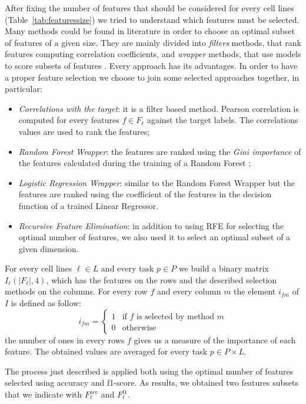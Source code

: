 After fixing the number of features that should be considered for every cell lines (Table~\ref{tab:featuressize}) we tried to understand which features must be selected. Many methods could be found in literature in order to choose an optimal subset of features of a given size. They are mainly divided into \emph{filters} methods, that rank features computing correlation coefficients, and \emph{wrapper} methods, that use models to score subsets of features \cite{Guyon}. Every approach has its advantages. In order to have a proper feature selection we choose to join some selected approaches together, in particular:
\begin{itemize}
    \item \textit{Correlations with the target}: it is a filter based method. Pearson correlation is computed for every features $f \in F_\ell$ against the target labels. The correlations values are used to rank the features;
    \item \textit{Random Forest Wrapper}: the features are ranked using the \emph{Gini importance} \cite{giniimportance} of the features calculated during the training of a Random Forest \cite{breiman2001random}; 
    \item \textit{Logistic Regression Wrapper}: similar to the Random Forest Wrapper but the features are ranked using the coefficient of the features in the decision function of a trained Linear Regressor.
    \item \emph{Recursive Feature Elimination}: in addition to using RFE for selecting the optimal number of features, we also used it to select an optimal subset of a given dimension. 
\end{itemize}
For every cell lines $\ell \in L$ and every task $p \in P$ we build a binary matrix $I_\ell(|F_\ell|, 4)$, which has the features on the rows and the described selection methods on the columns. For every row $f$ and every column $m$ the element $i_{fm}$ of $I$ is defined as follow: 
\[
    i_{fm} = \begin{cases} 1 & \mbox{if } f \mbox{ is selected by method } m \\ 0 & \mbox{otherwise} \end{cases}
\]
the number of ones in every rows $f$ gives us a measure of the importance of each feature. The obtained values are averaged for every task $p \in P \times L$.

The process just described is applied both using the optimal number of features selected using accuracy and f1-score. As results, we obtained two features subsets that we indicate with $F_\ell^{\textrm{acc}}$ and $F_\ell^{\textrm{f1}}$.

